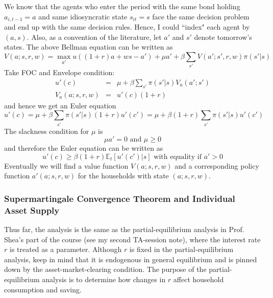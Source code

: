 \documentclass[12pt]{article}
\begin{document}
We know that the agents who enter the period with the same bond holding $a_{i,t-1} = a$ and same idiosyncratic state $s_{it} = s$ face the same decision problem and end up with the same decision rules. Hence, I could ``index" each agent by $(a,s)$. Also, as a convention of the literature, let $a'$ and $s'$ denote tomorrow's states. The above Bellman equation can be written as
\begin{equation} \label{eq:bellman}
	V(a;s, r, w) = \max_{a'} u\left((1+r) a + ws - a'\right) + \mu a' + \beta \sum_{s'}V(a';s', r, w) \pi(s'|s)
\end{equation}
Take FOC and Envelope condition:
\begin{eqnarray}
	u'(c) &=& \mu + \beta \sum_{s'} \pi(s'|s) V_a(a';s') \\
	V_a(a;s, r, w) &=& u'(c) (1+r) 
\end{eqnarray}
and hence we get an Euler equation
\begin{equation}
	u'(c) = \mu + \beta \sum_{s'} \pi(s'|s) (1+r) u'(c') = \mu + \beta (1+r) \sum_{s'} \pi(s'|s) u'(c')
\end{equation}
The slackness condition for $\mu$ is 
\begin{equation}
	\mu a' = 0 \text{ and } \mu \geq 0
\end{equation}
and therefore the Euler equation can be written as
\begin{equation}
	u'(c) \geq \beta(1+r) \mathbb{E}_t[u'(c')|s] \text{ with equality if $a' > 0$}
\end{equation}
Eventually we will find a value function $V(a;s, r, w)$ and a corresponding policy function $a'(a;s, r, w)$ for the households with state $(a;s, r, w)$.

\subsubsection{Supermartingale Convergence Theorem and Individual Asset Supply}

Thus far, the analysis is the same as the partial-equilibrium analysis in Prof. Shea's part of the course (see my second TA-session note), where the interest rate $r$ is treated as a parameter. Although $r$ is fixed in the partial-equilibrium analysis, keep in mind that it is endogenous in general equilibrium and is pinned down by the asset-market-clearing condition. The purpose of the partial-equilibrium analysis is to determine how changes in $r$ affect household consumption and saving.
\end{document}
